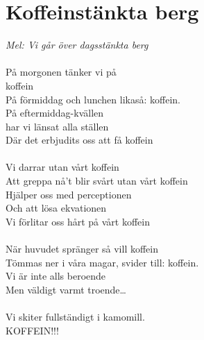\documentclass[a5paper,15pt]{article}
\begin{document}
\section{Koffeinstänkta berg}
\emph{Mel: Vi går över dagsstänkta berg}\\
\\
På morgonen tänker vi på \\koffein\\
På förmiddag och lunchen likaså: koffein.\\
På eftermiddag-kvällen\\
har vi länsat alla ställen\\
Där det erbjudits oss att få koffein\\
\\
Vi darrar utan vårt koffein\\
Att greppa nå’t blir svårt utan vårt koffein\\
Hjälper oss med perceptionen\\
Och att lösa ekvationen\\
Vi förlitar oss hårt på vårt koffein\\
\\
När huvudet spränger så vill koffein\\
Tömmas ner i våra magar, svider till: koffein.\\
Vi är inte alls beroende\\
Men väldigt varmt troende…\\
\\
Vi skiter fullständigt i kamomill.\\
KOFFEIN!!!
\end{document}
